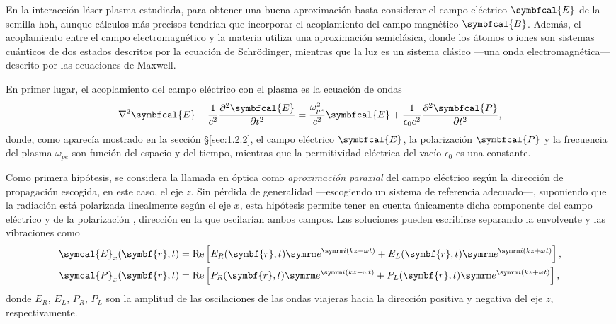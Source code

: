 En la interacción láser-plasma estudiada, para obtener una buena aproximación basta considerar el campo eléctrico $\symbfcal{E}$ de la semilla \acrshort{hoh}, aunque cálculos más precisos tendrían que incorporar el acoplamiento del campo magnético $\symbfcal{B}$. Además, el acoplamiento entre el campo electromagnético y la materia utiliza una aproximación semiclásica, donde los átomos o iones son sistemas cuánticos de dos estados descritos por la ecuación de Schrödinger, mientras que la luz es un sistema clásico ---una onda electromagnética--- descrito por las ecuaciones de Maxwell. 

En primer lugar, el acoplamiento del campo eléctrico con el plasma es la ecuación de ondas 
\begin{equation}\label{eq:3.0}
  \laplacian \symbfcal{E} - \frac{1}{c^{2}}\pdvN{\symbfcal{E}}{t}{2} = \frac{\omega^{2}_{pe}}{c^{2}}\symbfcal{E} + \frac{1}{\epsilon_{0}c^{2}}\pdvN{\symbfcal{P}}{t}{2},
\end{equation}
donde, como aparecía mostrado en la sección \S\ref{sec:1.2.2}, el campo eléctrico $\symbfcal{E}$, la polarización $\symbfcal{P}$ y la frecuencia del plasma $\omega_{pe}$ son función del espacio y del tiempo, mientras que la permitividad eléctrica del vacío $\epsilon_{0}$ es una constante. 

Como primera hipótesis, se considera la llamada en óptica\autocite{Born2019} como \emph{aproximación paraxial} del campo eléctrico según la dirección de propagación escogida, en este caso, el eje $z$. Sin pérdida de generalidad ---escogiendo un sistema de referencia adecuado---, suponiendo que la radiación está polarizada linealmente según el eje $x$, esta hipótesis permite tener en cuenta únicamente dicha componente del campo eléctrico y de la polarización \autocite{Larroche2000}, dirección en la que oscilarían ambos campos. Las soluciones pueden escribirse separando la envolvente y las vibraciones como
\begin{align}
  \label{eq:3.1a}
  \symcal{E}_{x}(\symbf{r},t) &= \RE \left[E_{R}(\symbf{r},t)\eu^{\iu (kz - \omega t)} + E_{L}(\symbf{r},t)\eu^{\iu (kz + \omega t)}\right], \\
  \label{eq:3.1b}
  \symcal{P}_{x}(\symbf{r},t) &= \RE \left[P_{R}(\symbf{r},t)\eu^{\iu (kz - \omega t)} + P_{L}(\symbf{r},t)\eu^{\iu (kz + \omega t)}\right], 
\end{align}
donde $E_{R}$, $E_{L}$, $P_{R}$, $P_{L}$ son la amplitud de las oscilaciones de las ondas viajeras hacia la dirección positiva y negativa del eje $z$, respectivamente. 

